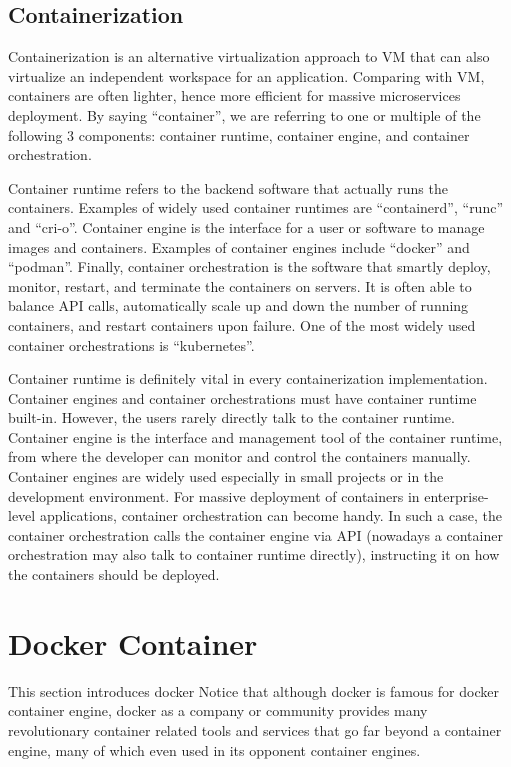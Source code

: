 \subsection{Containerization}

Containerization is an alternative virtualization approach to VM that can also virtualize an independent workspace for an application. Comparing with VM, containers are often lighter, hence more efficient for massive microservices deployment. By saying ``container'', we are referring to one or multiple of the following 3 components: container runtime, container engine, and container orchestration.

Container runtime refers to the backend software that actually runs the containers. Examples of widely used container runtimes are ``containerd'', ``runc'' and ``cri-o''. Container engine is the interface for a user or software to manage images and containers. Examples of container engines include ``docker'' and ``podman''. Finally, container orchestration is the software that smartly deploy, monitor, restart, and terminate the containers on servers. It is often able to balance API calls, automatically scale up and down the number of running containers, and restart containers upon failure. One of the most widely used container orchestrations is ``kubernetes''. 

Container runtime is definitely vital in every containerization implementation. Container engines and container orchestrations must have container runtime built-in. However, the users rarely directly talk to the container runtime. Container engine is the interface and management tool of the container runtime, from where the developer can monitor and control the containers manually. Container engines are widely used especially in small projects or in the development environment. For massive deployment of containers in enterprise-level applications, container orchestration can become handy. In such a case, the container orchestration calls the container engine via API (nowadays a container orchestration may also talk to container runtime directly), instructing it on how the containers should be deployed.

\section{Docker Container} \label{ch:vac:sec:dc}

This section introduces docker Notice that although docker is famous for docker container engine, docker as a company or community provides many revolutionary container related tools and services that go far beyond a container engine, many of which even used in its opponent container engines.

